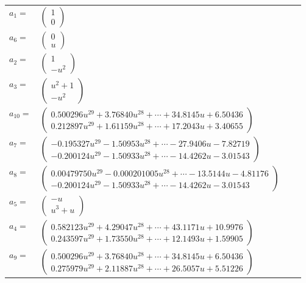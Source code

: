 \documentclass[1p]{elsarticle_modified}
\theoremstyle{definition}
\begin{document}
\begin{tabular}{m{7pt} m{180pt} m{7pt} m{180pt} }
\flushright $a_{1}=$&$\begin{pmatrix}1\\0\end{pmatrix}$ \\
\flushright $a_{6}=$&$\begin{pmatrix}0\\u\end{pmatrix}$ \\
\flushright $a_{2}=$&$\begin{pmatrix}1\\- u^2\end{pmatrix}$ \\
\flushright $a_{3}=$&$\begin{pmatrix}u^2+1\\- u^2\end{pmatrix}$ \\
\flushright $a_{10}=$&$\begin{pmatrix}0.500296 u^{29}+3.76840 u^{28}+\cdots+34.8145 u+6.50436\\0.212897 u^{29}+1.61159 u^{28}+\cdots+17.2043 u+3.40655\end{pmatrix}$ \\
\flushright $a_{7}=$&$\begin{pmatrix}-0.195327 u^{29}-1.50953 u^{28}+\cdots-27.9406 u-7.82719\\-0.200124 u^{29}-1.50933 u^{28}+\cdots-14.4262 u-3.01543\end{pmatrix}$ \\
\flushright $a_{8}=$&$\begin{pmatrix}0.00479750 u^{29}-0.000201005 u^{28}+\cdots-13.5144 u-4.81176\\-0.200124 u^{29}-1.50933 u^{28}+\cdots-14.4262 u-3.01543\end{pmatrix}$ \\
\flushright $a_{5}=$&$\begin{pmatrix}- u\\u^3+u\end{pmatrix}$ \\
\flushright $a_{4}=$&$\begin{pmatrix}0.582123 u^{29}+4.29047 u^{28}+\cdots+43.1171 u+10.9976\\0.243597 u^{29}+1.73550 u^{28}+\cdots+12.1493 u+1.59905\end{pmatrix}$ \\
\flushright $a_{9}=$&$\begin{pmatrix}0.500296 u^{29}+3.76840 u^{28}+\cdots+34.8145 u+6.50436\\0.275979 u^{29}+2.11887 u^{28}+\cdots+26.5057 u+5.51226\end{pmatrix}$ \\

\end{tabular}
\end{document}
